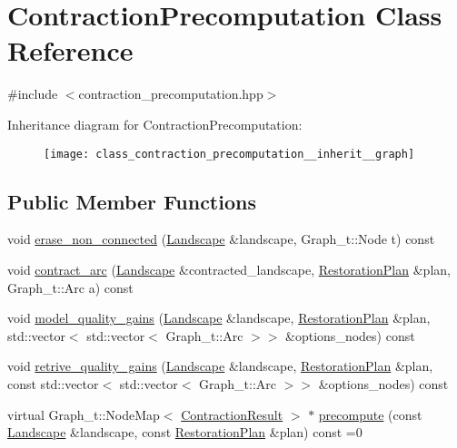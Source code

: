 \hypertarget{class_contraction_precomputation}{}\section{Contraction\+Precomputation Class Reference}
\label{class_contraction_precomputation}


{\ttfamily \#include $<$contraction\+\_\+precomputation.\+hpp$>$}



Inheritance diagram for Contraction\+Precomputation\+:\nopagebreak
\begin{figure}[H]
\begin{center}
\leavevmode
\texttt{[image: class\_contraction\_precomputation\_\_inherit\_\_graph]}
\end{center}
\end{figure}
\subsection*{Public Member Functions}
\begin{DoxyCompactItemize}
\item 
void \hyperlink{class_contraction_precomputation_ab4ae0b053d4cb51b2d2c4d07027ee2b7}{erase\+\_\+non\+\_\+connected} (\hyperlink{class_landscape}{Landscape} \&landscape, Graph\+\_\+t\+::\+Node t) const
\item 
void \hyperlink{class_contraction_precomputation_a6cbc9c5ee6d4ec9a5092d6e624922396}{contract\+\_\+arc} (\hyperlink{class_landscape}{Landscape} \&contracted\+\_\+landscape, \hyperlink{class_restoration_plan}{Restoration\+Plan} \&plan, Graph\+\_\+t\+::\+Arc a) const
\item 
void \hyperlink{class_contraction_precomputation_a6ea4ee46a1805ced601de847969cab61}{model\+\_\+quality\+\_\+gains} (\hyperlink{class_landscape}{Landscape} \&landscape, \hyperlink{class_restoration_plan}{Restoration\+Plan} \&plan, std\+::vector$<$ std\+::vector$<$ Graph\+\_\+t\+::\+Arc $>$$>$ \&options\+\_\+nodes) const
\item 
void \hyperlink{class_contraction_precomputation_a6749c81605043e4398c80b49293b44c6}{retrive\+\_\+quality\+\_\+gains} (\hyperlink{class_landscape}{Landscape} \&landscape, \hyperlink{class_restoration_plan}{Restoration\+Plan} \&plan, const std\+::vector$<$ std\+::vector$<$ Graph\+\_\+t\+::\+Arc $>$$>$ \&options\+\_\+nodes) const
\item 
virtual Graph\+\_\+t\+::\+Node\+Map$<$ \hyperlink{class_contraction_result}{Contraction\+Result} $>$ $\ast$ \hyperlink{class_contraction_precomputation_a205ee98224bfa783a7ab27d3a986468b}{precompute} (const \hyperlink{class_landscape}{Landscape} \&landscape, const \hyperlink{class_restoration_plan}{Restoration\+Plan} \&plan) const =0
\end{DoxyCompactItemize}


